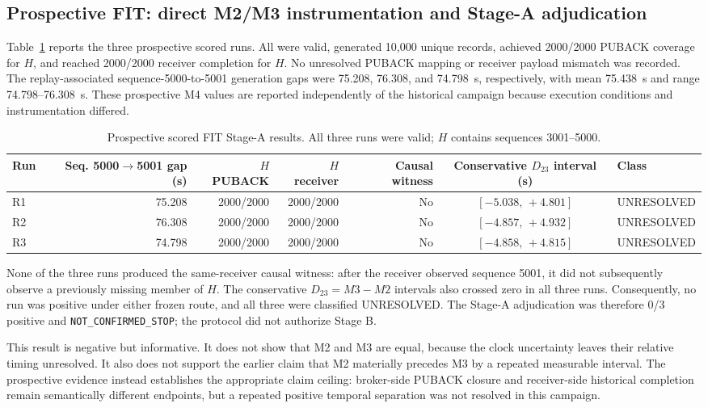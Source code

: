 \documentclass[journal]{IEEEtran}
\begin{document}
\subsection{Prospective FIT: direct M2/M3 instrumentation and Stage-A adjudication}

Table~\ref{tab:stagea} reports the three prospective scored runs. All were valid, generated 10,000 unique records, achieved 2000/2000 PUBACK coverage for $H$, and reached 2000/2000 receiver completion for $H$. No unresolved PUBACK mapping or receiver payload mismatch was recorded. The replay-associated sequence-5000-to-5001 generation gaps were 75.208, 76.308, and 74.798~s, respectively, with mean 75.438~s and range 74.798--76.308~s. These prospective M4 values are reported independently of the historical campaign because execution conditions and instrumentation differed.

\begin{table}[t]
\centering
\small
\caption{Prospective scored FIT Stage-A results. All three runs were valid; $H$ contains sequences 3001--5000.}
\label{tab:stagea}
\begin{tabular}{@{}lrrrrcl@{}}
\toprule
\textbf{Run} &
\textbf{Seq. 5000$\rightarrow$5001 gap (s)} &
\textbf{$H$ PUBACK} &
\textbf{$H$ receiver} &
\textbf{Causal witness} &
\textbf{Conservative $D_{23}$ interval (s)} &
\textbf{Class} \\
\midrule
R1 & 75.208 & 2000/2000 & 2000/2000 & No & $[-5.038,\,+4.801]$ & UNRESOLVED \\
R2 & 76.308 & 2000/2000 & 2000/2000 & No & $[-4.857,\,+4.932]$ & UNRESOLVED \\
R3 & 74.798 & 2000/2000 & 2000/2000 & No & $[-4.858,\,+4.815]$ & UNRESOLVED \\
\bottomrule
\end{tabular}
\end{table}

None of the three runs produced the same-receiver causal witness: after the receiver observed sequence 5001, it did not subsequently observe a previously missing member of $H$. The conservative $D_{23}=M3-M2$ intervals also crossed zero in all three runs. Consequently, no run was positive under either frozen route, and all three were classified UNRESOLVED. The Stage-A adjudication was therefore 0/3 positive and \texttt{NOT\_CONFIRMED\_STOP}; the protocol did not authorize Stage B.

This result is negative but informative. It does not show that M2 and M3 are equal, because the clock uncertainty leaves their relative timing unresolved. It also does not support the earlier claim that M2 materially precedes M3 by a repeated measurable interval. The prospective evidence instead establishes the appropriate claim ceiling: broker-side PUBACK closure and receiver-side historical completion remain semantically different endpoints, but a repeated positive temporal separation was not resolved in this campaign.
\end{document}

